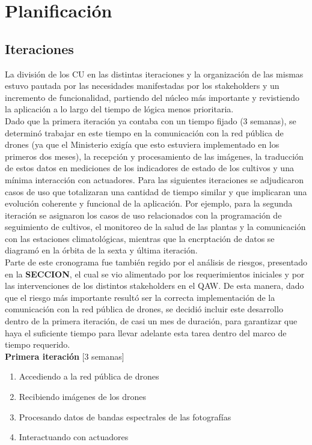 
\section{Planificación}

\subsection{Iteraciones}

La división de los CU en las distintas iteraciones y la organización de las mismas estuvo pautada por las necesidades manifestadas por los stakeholders y un incremento de funcionalidad, partiendo del núcleo más importante y revistiendo la aplicación a lo largo del tiempo de lógica menos prioritaria.\\
\indent Dado que la primera iteración ya contaba con un tiempo fijado (3 semanas), se determinó trabajar en este tiempo en la comunicación con la red pública de drones (ya que el Ministerio exigía que esto estuviera implementado en los primeros dos meses), la recepción y procesamiento de las imágenes, la traducción de estos datos en mediciones de los indicadores de estado de los cultivos y una mínima interacción con actuadores. Para las siguientes iteraciones se adjudicaron casos de uso que totalizaran una cantidad de tiempo similar y que implicaran una evolución coherente y funcional de la aplicación. Por ejemplo, para la segunda iteración se asignaron los casos de uso relacionados con la programación de seguimiento de cultivos, el monitoreo de la salud de las plantas y la comunicación con las estaciones climatológicas, mientras que la encrptación de datos se diagramó en la órbita de la sexta y última iteración.\\
\indent Parte de este cronograma fue también regido por el análisis de riesgos, presentado en la \textbf{SECCION}, el cual se vio alimentado por los requerimientos iniciales y por las intervenciones de los distintos stakeholders en el QAW. De esta manera, dado que el riesgo más importante resultó ser la correcta implementación de la comunicación con la red pública de drones, se decidió incluir este desarrollo dentro de la primera iteración, de casi un mes de duración, para garantizar que haya el suficiente tiempo para llevar adelante esta tarea dentro del marco de tiempo requerido.\\

\noindent \textbf{Primera iteración} [3 semanas]
    \vspace{-5pt}
	\begin{enumerate} \itemsep -2pt
		\item Accediendo a la red pública de drones
		\item Recibiendo imágenes de los drones
		\item Procesando datos de bandas espectrales de las fotografías
		\item Interactuando con actuadores
	\end{enumerate}

